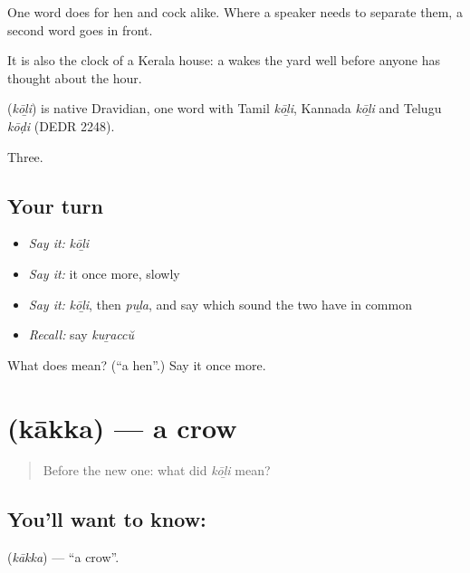 One word does for hen and cock alike. Where a speaker needs to separate them, a second word goes in front.

It is also the clock of a Kerala house: a  wakes the yard well before anyone has thought about the hour.

\begin{cousinweb}
\textbf{} (\emph{kōḻi}) is native Dravidian, one word with Tamil \emph{kōḻi}, Kannada \emph{kōḻi} and Telugu \emph{kōḍi} (DEDR 2248).
\end{cousinweb}

\begin{grammarlens}[title={What you've built}]
Three.
\end{grammarlens}

\subsection*{Your turn}
\begin{itemize}
\raggedright
  \item \emph{Say it:} \emph{kōḻi}
  \item \emph{Say it:} it once more, slowly
  \item \emph{Say it:} \emph{kōḻi}, then \emph{puḻa}, and say which sound the two have in common
  \item \emph{Recall:} say \emph{kuṟaccŭ}
\end{itemize}

\begin{tcolorbox}[breakable,colback=teal!4,colframe=teal!35!black,title={Before you move on}]
What does  mean? (\textquotedblleft{}a hen\textquotedblright{}.) Say it once more.
\end{tcolorbox}
\section[\texorpdfstring{\ml{കാക്ക} (kākka)}{കാക്ക (kākka)}]{ (kākka) — a crow}

\label{lesson:ML-C60-crow}



\begin{quote}
Before the new one: what did \emph{kōḻi} mean?
\end{quote}

\subsection*{You'll want to know: }
\textbf{} (\emph{kākka}) — \textquotedblleft{}a crow\textquotedblright{}.

